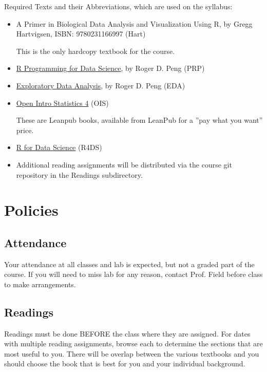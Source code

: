 \documentclass[11pt]{article} %
\begin{document}
  Required Texts and their Abbreviations, which are used on the syllabus:
  \begin{itemize}
 
    \item A Primer in Biological Data Analysis and Visualization Using R, by Gregg Hartvigsen, ISBN: 9780231166997 (Hart)
    
  This is the only hardcopy textbook for the course.
  
    \item \href{https://leanpub.com/rprogramming}{R Programming for Data Science}, by Roger D. Peng (PRP)
  
    \item \href{https://leanpub.com/exdata}{Exploratory Data Analysis}, by Roger D. Peng (EDA) 
    
    \item \href{https://leanpub.com/openintro-statistics}{Open Intro Statistics 4} (OIS)  
  
  These are  Leanpub books, available from LeanPub for a ”pay what you want” price. 
  
    \item \href{http://r4ds.had.co.nz/}{R for Data Science} (R4DS) 
  
    \item Additional reading assignments will be distributed via the course git repository in the Readings subdirectory. 
  \end{itemize}



\section{Policies}

  \subsection{Attendance}
  
    Your attendance at all classes and lab is expected, but not a graded part of the course. If you will need to miss lab for any reason, contact Prof. Field before class to make arrangements.
  
  \subsection{Readings}
  
    Readings must be done BEFORE the class where they are assigned. For dates with multiple reading assignments, browse each to determine the sections that are most useful to you. There will be overlap between the various textbooks and you should choose the book that is best for you and your individual background.
  
\end{document}
